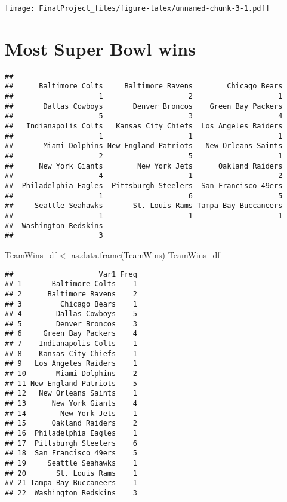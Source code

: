 \documentclass[
]{article}
\newenvironment{Shaded}{\begin{snugshade}}{\end{snugshade}}
\newcommand{\FunctionTok}[1]{\textcolor[rgb]{0.00,0.00,0.00}{#1}}
\newcommand{\NormalTok}[1]{#1}
\newcommand{\OtherTok}[1]{\textcolor[rgb]{0.56,0.35,0.01}{#1}}
\newcommand{\SpecialCharTok}[1]{\textcolor[rgb]{0.00,0.00,0.00}{#1}}
\newcommand{\StringTok}[1]{\textcolor[rgb]{0.31,0.60,0.02}{#1}}
\begin{document}
\texttt{[image: FinalProject\_files/figure-latex/unnamed-chunk-3-1.pdf]}

\hypertarget{most-super-bowl-wins}{%
\section{Most Super Bowl wins}\label{most-super-bowl-wins}}

\begin{Shaded}
\end{Shaded}

\begin{verbatim}
## 
##      Baltimore Colts     Baltimore Ravens        Chicago Bears 
##                    1                    2                    1 
##       Dallas Cowboys       Denver Broncos    Green Bay Packers 
##                    5                    3                    4 
##   Indianapolis Colts   Kansas City Chiefs  Los Angeles Raiders 
##                    1                    1                    1 
##       Miami Dolphins New England Patriots   New Orleans Saints 
##                    2                    5                    1 
##      New York Giants        New York Jets      Oakland Raiders 
##                    4                    1                    2 
##  Philadelphia Eagles  Pittsburgh Steelers  San Francisco 49ers 
##                    1                    6                    5 
##     Seattle Seahawks       St. Louis Rams Tampa Bay Buccaneers 
##                    1                    1                    1 
##  Washington Redskins 
##                    3
\end{verbatim}

\begin{Shaded}
\begin{Highlighting}[]
\NormalTok{TeamWins\_df }\OtherTok{\textless{}{-}} \FunctionTok{as.data.frame}\NormalTok{(TeamWins)}
\NormalTok{TeamWins\_df}
\end{Highlighting}
\end{Shaded}

\begin{verbatim}
##                    Var1 Freq
## 1       Baltimore Colts    1
## 2      Baltimore Ravens    2
## 3         Chicago Bears    1
## 4        Dallas Cowboys    5
## 5        Denver Broncos    3
## 6     Green Bay Packers    4
## 7    Indianapolis Colts    1
## 8    Kansas City Chiefs    1
## 9   Los Angeles Raiders    1
## 10       Miami Dolphins    2
## 11 New England Patriots    5
## 12   New Orleans Saints    1
## 13      New York Giants    4
## 14        New York Jets    1
## 15      Oakland Raiders    2
## 16  Philadelphia Eagles    1
## 17  Pittsburgh Steelers    6
## 18  San Francisco 49ers    5
## 19     Seattle Seahawks    1
## 20       St. Louis Rams    1
## 21 Tampa Bay Buccaneers    1
## 22  Washington Redskins    3
\end{verbatim}
\end{document}
